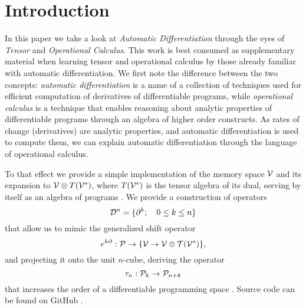 \section{Introduction}\label{sec:introduction}

In this paper we take a look at \emph{Automatic Differentiation} through the eyes of \emph{Tensor} and \emph{Operational Calculus}. This work is best consumed as supplementary material when learning tensor and operational calculus by those already familiar with automatic differentiation. We first note the difference between the two concepts: \emph{automatic differentiation} is a name of a collection of techniques used for efficient computation of derivatives of differentiable programs, while \emph{operational calculus} is a technique that enables reasoning about analytic properties of differentiable programs through an algebra of higher order constructs. As rates of change (derivatives) are analytic properties, and automatic differentiation is used to compute them, we can explain automatic differentiation through the language of operational calculus.

To that effect we provide a simple implementation of the memory space $\mathcal{V}$ and its expansion to $\mathcal{V}\otimes T(\mathcal{V}^*)$, where $T(\mathcal{V}^*)$ is the tensor algebra of its dual, serving by itself as an algebra of programs \cite[Definition~4.1]{OperationalCalculus}.
We provide a construction of operators
\begin{equation}
\mathcal{D}^n=\{\partial^k;\quad 0\le k\le n\}
\end{equation}
that allow us to mimic the generalized shift operator \cite[Theorem~5.2]{OperationalCalculus}
 \begin{equation}
   e^{h\partial}:\mathcal{P}\to \{\mathcal{V}\to \mathcal{V}\otimes \mathcal{T}(\mathcal{V}^*)\},
         \end{equation}
and projecting it onto the unit $n$-cube, deriving the operator 
\begin{equation}\label{eq:sumd}
\tau_n:\mathcal{P}_k\to\mathcal{P}_{n+k}
\end{equation} 
that increases the order of a differentiable programming space \cite[Proposition~5.1]{OperationalCalculus}.
Source code can be found on GitHub \cite{dCpp}.


